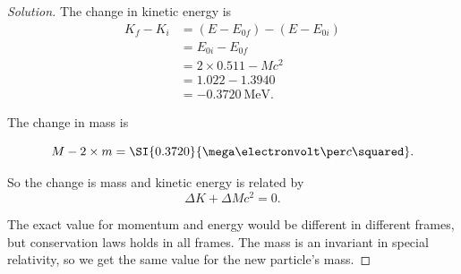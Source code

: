 \begin{proof}[Solution]
	The change in kinetic energy is
	\begin{align*}
		K_f - K_i &= (E - E_{0f}) - (E - E_{0i})\\
		&= E_{0i} - E_{0f} \\
		&= 2 \times 0.511 -  M c^2 \\
		&= 1.022 - 1.3940 \\
		&= \SI{-0.3720}{\mega\electronvolt}
	.\end{align*} 

	The change in mass is

	\[
		M - 2 \times m = \SI{0.3720}{\mega\electronvolt \per c\squared}
	.\] 
	
	So the change is mass and kinetic energy is related by
	\[
		\Delta K + \Delta M c^2 = 0
	.\] 
	
	The exact value for momentum and energy would be different in different frames, but conservation laws holds in all frames. The mass is an invariant in special relativity, so we get the same value for the new particle's mass.

\end{proof}

